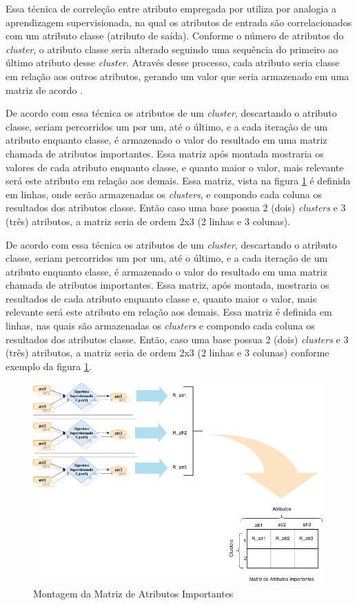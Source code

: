 Essa técnica de correleção entre atributo empregada por \cite{Lopes2016} utiliza por analogia a aprendizagem supervisionada, na qual os atributos de entrada são correlacionados com um atributo classe (atributo de saída). Conforme o número de atributos do \textit{cluster}, o atributo classe seria alterado seguindo uma sequência do primeiro ao último atributo desse \textit{cluster}. Através desse processo, cada atributo seria classe em relação aos outros atributos, gerando um valor que seria armazenado em uma matriz de acordo . 

De acordo com essa técnica os atributos de um \textit{cluster}, descartando o atributo classe, seriam percorridos um por um, até o último, e a cada iteração de um atributo enquanto classe, é armazenado o valor do resultado em uma matriz chamada de atributos importantes. Essa matriz após montada mostraria os valores de cada atributo enquanto classe, e quanto maior o valor, mais relevante será este atributo em relação aos demais. Essa matriz, vista na figura \ref{fig:matribimp} é definida em linhas, onde serão armazenadas os \textit{clusters}, e compondo cada coluna os resultados dos atributos classe. Então caso uma base possua 2 (dois) \textit{clusters} e 3 (três) atributos, a matriz seria de ordem 2x3 (2 linhas e 3 colunas).

De acordo com essa técnica os atributos de um \textit{cluster}, descartando o atributo classe, seriam percorridos um por um, até o último, e a cada iteração de um atributo enquanto classe, é armazenado o valor do resultado em uma matriz chamada de atributos importantes. Essa matriz, após montada, mostraria os resultados de cada atributo enquanto classe e, quanto maior o valor, mais relevante será este atributo em relação aos demais. Essa matriz é definida em linhas, nas quais são armazenadas os \textit{clusters} e compondo cada coluna os resultados dos atributos classe. Então, caso uma base possua 2 (dois) \textit{clusters} e 3 (três) atributos, a matriz seria de ordem 2x3 (2 linhas e 3 colunas) conforme exemplo da figura  \ref{fig:matribimp}.

\begin{figure}[h!]
        \centering
        \includegraphics[scale=0.5]{figs/montagem_matrizAtribImp.png}
        \caption{Montagem da Matriz de Atributos Importantes } \label{fig:matribimp}
\end{figure}

